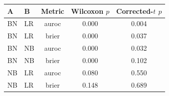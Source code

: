\begin{tabular}{llccc}
\toprule
A & B & Metric & Wilcoxon $p$ & Corrected-$t$ $p$ \\
\midrule
BN & LR & auroc & 0.000 & 0.004 \\
BN & LR & brier & 0.000 & 0.037 \\
BN & NB & auroc & 0.000 & 0.032 \\
BN & NB & brier & 0.000 & 0.102 \\
NB & LR & auroc & 0.080 & 0.550 \\
NB & LR & brier & 0.148 & 0.689 \\
\bottomrule
\end{tabular}